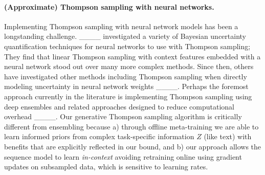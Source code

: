 \paragraph{(Approximate) Thompson sampling with neural networks.}
Implementing Thompson sampling with neural network models has been a longstanding challenge. ____ investigated a variety of Bayesian uncertainty quantification techniques for neural networks to use with Thompson sampling; They find that linear Thompson sampling with context features embedded with a neural network stood out over many more complex methods. Since then, others have investigated other methods including Thompson sampling when directly modeling uncertainty in neural network weights ____. Perhaps the foremost approach currently in the literature is implementing Thompson sampling using deep ensembles and related approaches designed to reduce computational overhead ____. Our generative Thompson sampling algorithm is critically different from ensembling because a) through offline meta-training we are able to learn informed priors from complex task-specific information $Z$ (like text) with benefits that are explicitly reflected in our bound, and b) our approach allows the sequence model to learn \textit{in-context} avoiding retraining online using gradient updates on subsampled data, which is sensitive to learning rates.